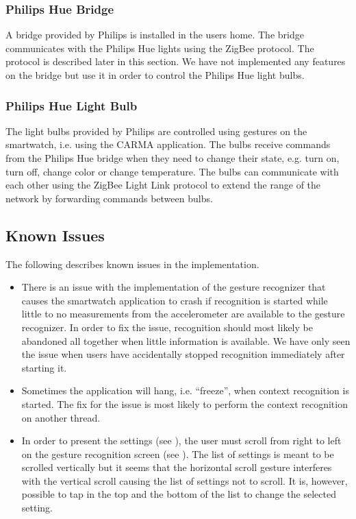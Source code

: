 \subsubsection{Philips Hue Bridge}

A bridge provided by Philips is installed in the users home. The bridge communicates with the Philips Hue lights using the ZigBee protocol. The protocol is described later in this section. We have not implemented any features on the bridge but use it in order to control the Philips Hue light bulbs.

\subsubsection{Philips Hue Light Bulb}

The light bulbs provided by Philips are controlled using gestures on the smartwatch, i.e. using the CARMA application. The bulbs receive commands from the Philips Hue bridge when they need to change their state, e.g. turn on, turn off, change color or change temperature. The bulbs can communicate with each other using the ZigBee Light Link protocol to extend the range of the network by forwarding commands between bulbs.

\subsection{Known Issues}

The following describes known issues in the implementation.

\begin{itemize}
\item There is an issue with the implementation of the gesture recognizer that causes the smartwatch application to crash if recognition is started while little to no measurements from the accelerometer are available to the gesture recognizer. In order to fix the issue, recognition should most likely be abandoned all together when little information is available. We have only seen the issue when users have accidentally stopped recognition immediately after starting it.
\item Sometimes the application will hang, i.e. ``freeze'', when context recognition is started. The fix for the issue is most likely to perform the context recognition on another thread.
\item In order to present the settings (see ), the user must scroll from right to left on the gesture recognition screen (see ). The list of settings is meant to be scrolled vertically but it seems that the horizontal scroll gesture interferes with the vertical scroll causing the list of settings not to scroll. It is, however, possible to tap in the top and the bottom of the list to change the selected setting.
\end{itemize}

